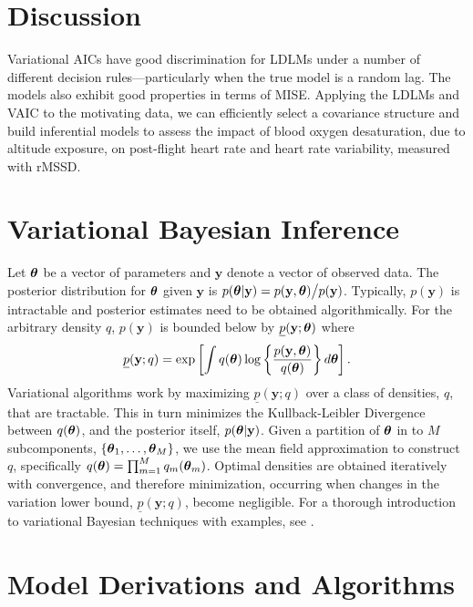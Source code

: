 \documentclass[10pt]{article}
\newcommand{\btheta}{{\mbox{\boldmath$\theta$}}}
\newcommand{\by}{\textbf{y}}
\newcommand{\up}{\underline{p}}
\begin{document}
\section{Discussion}

Variational AICs have good discrimination for LDLMs under a number of different decision rules---particularly when the true model is a random lag. The models also exhibit good properties in terms of MISE. Applying the LDLMs and VAIC to the motivating data, we can efficiently select a covariance structure and build inferential models to assess the impact of blood oxygen desaturation, due to altitude exposure, on post-flight heart rate and heart rate variability, measured with rMSSD. 



\appendix

\section{Variational Bayesian Inference}
\label{a:vbi}
	
	Let $\btheta$ be a vector of parameters and $\by$ denote a vector of observed data. The posterior distribution for $\btheta$ given $\by$ is $p(\btheta | \by) = p(\by, \btheta)\big/p(\by)$. Typically, $p(\by)$ is intractable and posterior estimates need to be obtained algorithmically. For the arbitrary density $q$, $p(\by)$ is bounded below by $\up(\by; \btheta)$ where
	\begin{align*}
		\up(\by; q) = \exp\left[ \int q(\btheta) \log\left\{ \frac{p(\by, \btheta)}{q(\btheta)} \right\} d\btheta \right].
	\end{align*}
	Variational algorithms work by maximizing $\up(\by; q)$ over a class of densities, $q$, that are tractable. This in turn minimizes the Kullback-Leibler Divergence between $q(\btheta)$, and the posterior itself, $p(\btheta | \by)$. Given a partition of $\btheta$ in to $M$ subcomponents, $\{\btheta_1, \ldots, \btheta_M\}$, we use the mean field approximation to construct $q$, specifically $q(\btheta) = \prod_{m = 1}^M q_m(\btheta_m)$. Optimal densities are obtained iteratively with convergence, and therefore minimization, occurring when changes in the variation lower bound, $\up(\by; q)$, become negligible. For a thorough introduction to variational Bayesian techniques with examples, see \cite{OrmerodWand2010}.

\section{Model Derivations and Algorithms}
\label{a:deriv}
\end{document}
